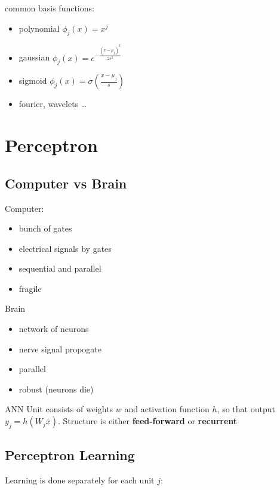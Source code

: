 \documentclass[]{article}
\theoremstyle{definition}
\begin{document}
    \vspace{5mm}

    common basis functions:
    \begin{itemize}
        \item polynomial $\phi_j (x) = x^j$
        \item gaussian $\phi_j (x) = e^{- \frac{(x - \mu_j)^2}{2s^2}}$
        \item sigmoid $\phi_j (x) = \sigma (\frac{x - \mu_j}{s})$
        \item fourier, wavelets \ldots
    \end{itemize}

    
    \section{Perceptron}
    \label{sec:perceptron}
    
    \subsection{Computer vs Brain}
    \label{sub:computer_vs_brain}
    Computer:
    \begin{itemize}
        \item bunch of gates
        \item electrical signals by gates
        \item sequential and parallel
        \item fragile
    \end{itemize}
    Brain 
    \begin{itemize}
        \item network of neurons
        \item nerve signal propogate
        \item parallel
        \item robust (neurons die)
    \end{itemize}

    ANN Unit consists of weights $w$ and activation function $h$, so that output $y_j = h(W_j \bar x)$. Structure is either \textbf{feed-forward} or \textbf{recurrent}

    \subsection{Perceptron Learning}
    \label{sub:perceptron_learning}
    
    Learning is done separately for each unit $j$:
    \begin{algorithmic}
            \EndIf
        \EndFor
    \end{algorithmic}
    
\end{document}
